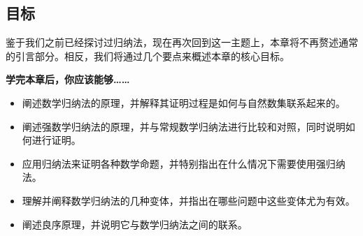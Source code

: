 \subsection{目标}

鉴于我们之前已经探讨过归纳法，现在再次回到这一主题上，本章将不再赘述通常的引言部分。相反，我们将通过几个要点来概述本章的核心目标。

\textbf{学完本章后，你应该能够……}

\begin{itemize}
    \item 阐述数学归纳法的原理，并解释其证明过程是如何与自然数集联系起来的。
    \item 阐述强数学归纳法的原理，并与常规数学归纳法进行比较和对照，同时说明如何进行证明。
    \item 应用归纳法来证明各种数学命题，并特别指出在什么情况下需要使用强归纳法。
    \item 理解并阐释数学归纳法的几种变体，并指出在哪些问题中这些变体尤为有效。
    \item 阐述良序原理，并说明它与数学归纳法之间的联系。
\end{itemize}
